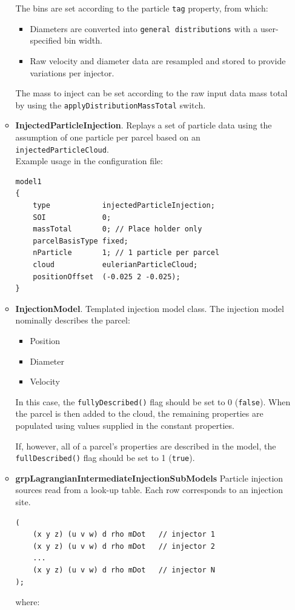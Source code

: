 \documentclass[12pt]{article}
\begin{document}
\begin{itemize}
\begin{itemize}
        The bins are set according to the particle \texttt{tag} property, from which:
        \begin{itemize}
            \item Diameters are converted into \texttt{general distributions} with a user-specified bin width.
            \item Raw velocity and diameter data are resampled and stored to provide variations per injector.
        \end{itemize}
        The mass to inject can be set according to the raw input data mass total by using the \texttt{applyDistributionMassTotal} switch.
        \item \textbf{InjectedParticleInjection}. Replays a set of particle data using the assumption of one particle per parcel based on an \texttt{injectedParticleCloud}.\\
        Example usage in the configuration file:
        \begin{verbatim}
model1
{
    type            injectedParticleInjection;
    SOI             0;
    massTotal       0; // Place holder only
    parcelBasisType fixed;
    nParticle       1; // 1 particle per parcel
    cloud           eulerianParticleCloud;
    positionOffset  (-0.025 2 -0.025);
}
        \end{verbatim}
        \item \textbf{InjectionModel}.
        Templated injection model class.
        The injection model nominally describes the parcel:
        \begin{itemize}
            \item Position
            \item Diameter
            \item Velocity
        \end{itemize}
        In this case, the \texttt{fullyDescribed()} flag should be set to 0 (\texttt{false}). When the parcel is then added to the cloud, the remaining properties are populated using values supplied in the constant properties.
        
        If, however, all of a parcel's properties are described in the model, the \texttt{fullDescribed()} flag should be set to 1 (\texttt{true}).
        \item \textbf{grpLagrangianIntermediateInjectionSubModels}
        Particle injection sources read from a look-up table. Each row corresponds to an injection site.
        \begin{verbatim}
(
    (x y z) (u v w) d rho mDot   // injector 1
    (x y z) (u v w) d rho mDot   // injector 2
    ...
    (x y z) (u v w) d rho mDot   // injector N
);
        \end{verbatim}
        where:\\
        

\end{itemize}
\end{itemize}
\end{document}
